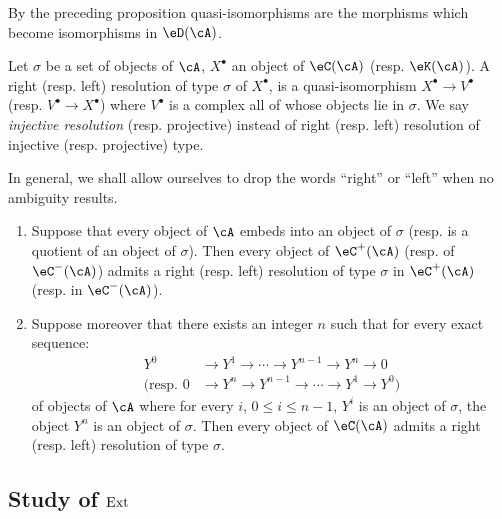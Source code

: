 By the preceding proposition quasi-isomorphisms are the
morphisms which become isomorphisms in $\eD(\cA)$. 





\begin{definition}\label{VIII:3-1-8}
Let $\sigma$ be a set of objects of $\cA$, $X^\bullet$ an object of
$\eC(\cA)$ (resp. $\eK(\cA)$). A right (resp. left) resolution of type
$\sigma$ of $X^\bullet$, is a quasi-isomorphism $X^\bullet \to V^\bullet$
(resp. $V^\bullet \to X^\bullet$) where $V^\bullet$ is a complex all of
whose objects lie in $\sigma$. We say \emph{injective resolution}
(resp. projective) instead of right (resp. left) resolution of
injective (resp. projective) type.
\end{definition}

In general, we shall allow ourselves to drop the words ``right'' or
``left'' when no ambiguity results. 





\begin{proposition}\label{VIII:3-1-9}
\begin{enumerate}
  \item Suppose that every object of $\cA$ embeds into an object of $\sigma$
    (resp. is a quotient of an object of $\sigma$). Then every object of
    $\eC^+(\cA)$ (resp. of $\eC^-(\cA)$) admits a right
    (resp. left) resolution of type $\sigma$ in $\eC^+(\cA)$ (resp. in
    $\eC^-(\cA)$).
  \item Suppose moreover that there exists an integer $n$ such that for every exact
    sequence: 
    \begin{align*}
      Y^0 &\to Y^1 \to \cdots \to Y^{n-1} \to Y^n \to 0 \\
      \text{(resp. } 0 &\to Y^n \to Y^{n-1} \to \cdots \to Y^1 \to Y^0 \text{)} 
    \end{align*}
    of objects of $\cA$ where for every $i$, $0\leqslant i\leqslant n-1$, $Y^i$ is
    an object of $\sigma$, the object $Y^n$ is an object of $\sigma$. Then every
    object of $\eC(\cA)$ admits a right (resp. left) resolution of type
    $\sigma$. 
\end{enumerate}
\end{proposition}










\subsection{Study of $\operatorname{Ext}$}\label{VIII:3-2}

